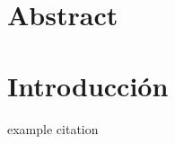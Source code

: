 \documentclass[12pt,oneside, a4paper]{book}
\begin{document}
    




\section*{Abstract}


\tableofcontents





\section{Introducción}
example citation \cite{shaham2018defending}




\printbibliography
\end{document}
